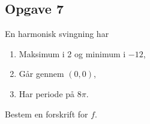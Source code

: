 \subsection*{Opgave 7}
En harmonisk svingning har
\begin{enumerate}[label=$\circ$]
	\item Maksimum i 2 og minimum i $-12$,
	\item Går gennem $(0,0)$,
	\item Har periode på $8\pi$.
\end{enumerate} 
Bestem en forskrift for $f$. 
